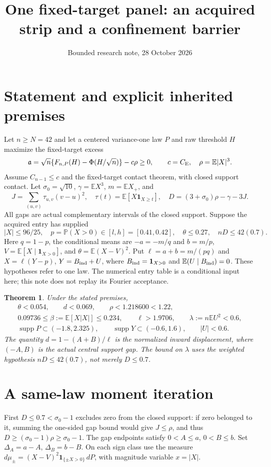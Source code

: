 \documentclass[11pt]{article}
\title{One fixed-target panel: an acquired strip and a confinement barrier}
\author{Bounded research note, 28 October 2026}\date{}
\newcommand{\E}{\mathbb E}\newcommand{\Pp}{\mathbb P}
\newcommand{\CE}{C_{\rm E}}\newcommand{\pos}[1]{(#1)_+}
\newtheorem{theorem}{Theorem}\newtheorem{lemma}[theorem]{Lemma}
\begin{document}
\maketitle

\section{Statement and explicit inherited premises}
Let $n\ge N=42$ and let a centered variance-one law $P$ and raw threshold
$H$ maximize the fixed-target excess
\[
 \mathfrak a=\sqrt n\{F_{n,P}(H)-\Phi(H/\sqrt n)\}-c\rho\ge0,
 \qquad c=\CE,\quad \rho=\E|X|^3.
\]
Assume $C_{n-1}\le c$ and the fixed-target contact theorem, with closed
support contact. Let $\sigma_0=\sqrt{10}$, $\gamma=\E X^3$,
$m=\E X_+$, and
\[
 J=\sum_{(u,v)}\tau_{u,v}(v-u)^2,
 \quad \tau(t)=\E[X\mathbf1_{X\ge t}],\quad
 D=(3+\sigma_0)\rho-\gamma-3J.
\]
All gaps are actual complementary intervals of the closed support.
Suppose the acquired entry has supplied
\begin{equation}\label{conf:entry}
 |X|\le96/25,\quad p=\Pp(X>0)\in[l,h]=[0.41,0.42],
 \quad\theta\le0.27,\quad nD\le42(0.7).
\end{equation}
Here $q=1-p$, the conditional means are $-a=-m/q$ and $b=m/p$,
$V=\E[X\mid\mathbf1_{X>0}]$, and $\theta=\E(X-V)^2$.
Put $\ell=a+b=m/(pq)$ and $X=\ell(Y-p)$, $Y=B_{\rm ind}+U$,
where $B_{\rm ind}=\mathbf1_{X>0}$ and $\E(U\mid B_{\rm ind})=0$.
These hypotheses refer to one law. The numerical entry table is a
conditional input here; this note does not replay its Fourier acceptance.

\begin{theorem}\label{conf:panel}
Under the stated premises,
\begin{gather*}
 \theta<0.054,\qquad d<0.069,\qquad \rho<1.218600<1.22,\\
 0.09736\le\beta:=\E[X|X|]\le0.234,
 \qquad \ell>1.9706,\qquad \lambda:=n\E U^2<0.6,\\
 \operatorname{supp}P\subset(-1.8,2.325),\qquad
 \operatorname{supp}Y\subset(-0.6,1.6),\qquad |U|<0.6.
\end{gather*}
The quantity $d=1-(A+B)/\ell$ is the normalized inward displacement,
where $(-A,B)$ is the actual central support gap. The bound on $\lambda$
uses the weighted hypothesis $nD\le42(0.7)$, not merely $D\le0.7$.
\end{theorem}

\section{A same-law moment iteration}
First $D\le0.7<\sigma_0-1$ excludes zero from the closed support:
if zero belonged to it, summing the one-sided gap bound would give
$J\le\rho$, and thus $D\ge(\sigma_0-1)\rho\ge\sigma_0-1$.
The gap endpoints satisfy $0<A\le a$, $0<B\le b$.
Set $\Delta_A=a-A$, $\Delta_B=b-B$.
On each sign class use the measure
$d\mu_\pm=(X-V)^2\mathbf1_{\{\pm X>0\}}\,dP$, with magnitude variable
$x=|X|$.
\end{document}
